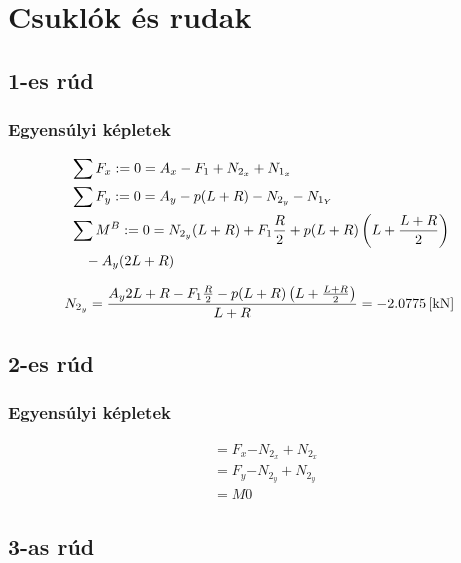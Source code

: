 \section{Csuklók és rudak}

\subsection{1-es rúd}

\sztaone

\subsubsection{Egyensúlyi képletek}
\begin{align*}
    &\sum{F_x} := 0 = A_x - F_1 + N_{2_x} + N_{1_x} \\
    &\sum{F_y} := 0 = A_y - p(L+R) - N_{2_y} - N_{1_Y} \\
    &\sum{M^B} := 0 = N_{2_y}(L+R) + F_1 \frac{R}{2} + p(L+R)\left(L+\frac{L+R}{2}\right) \nonumber \\
    &\quad - A_y (2L+R)
\end{align*}

\begin{equation*}
	N_{2_y} = \frac{A_y{2L+R} - F_1 \frac{R}{2} - p(L+R)\left(L+\frac{L+R}{2}\right)}{L+R} = \SI{-2.0775}{[\kilo\newton]}
\end{equation*}

\newpage

\subsection{2-es rúd}

\sztatwo

\subsubsection{Egyensúlyi képletek}
\begin{align*}
    &\equal{F_x}{- N_{2_x} + N_{2_x}} \\
    &\equal{F_y}{- N_{2_y} + N_{2_y}} \\
    &\equal{M}{0}
\end{align*}

\newpage

\subsection{3-as rúd}

\sztathree


